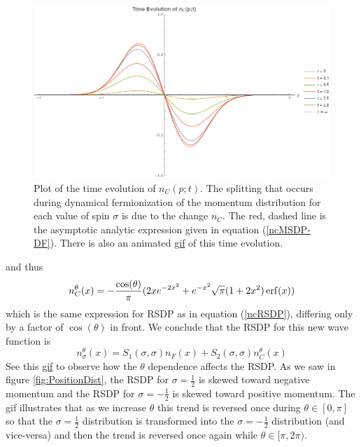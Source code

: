 \documentclass[onecolumn,english,aps,pra]{revtex4}
\begin{document}
\begin{figure}[h] 
\includegraphics[scale=0.45]{"../Plots/TimeEvolutionNC"}
\caption{Plot of the time evolution of $n_{C}(p;t)$. The splitting that occurs during dynamical fermionization of the momentum distribution for each value of spin $\sigma$ is due to the change $n_C$. The red, dashed line is the asymptotic analytic expression given in equation (\ref{ncMSDP-DF}). There is also an animated \href{https://github.com/TimSkaras/UltraColdAtoms/blob/master/Plots/TimeEvolutionNC.gif}{gif} of this time evolution.}
\label{fig:ncRSDP-DF}
\end{figure}
and thus 
\begin{equation}
n_C^\theta(x) = -\frac{\cos (\theta)}{\pi} (2xe^{-2x^2} + e^{-x^2}\sqrt{\pi} (1 + 2 x^2) \erf(x))
\end{equation}
which is the same expression for RSDP as in equation (\ref{ncRSDP}), differing only by a factor of $\cos(\theta)$ in front. We conclude that the RSDP for this new wave function is 
\begin{equation}
n_{\sigma}^\theta(x) = S_1(\sigma, \sigma)n_F(x) +  S_2(\sigma,\sigma) n_C^\theta(x)
\end{equation}
See this \href{https://github.com/TimSkaras/UltraColdAtoms/blob/master/Plots/ThetaEvolutionRSDP.gif}{gif} to observe how the $\theta$ dependence affects the RSDP. As we saw in figure \ref{fig:PositionDist}, the RSDP for  $\sigma = \frac{1}{2}$ is skewed toward negative momentum and the RSDP for  $\sigma = -\frac{1}{2}$ is skewed toward positive momentum. The gif illustrates that as we increase $\theta$ this trend is reversed once during $\theta \in [0, \pi]$ so that the $\sigma = \frac{1}{2}$ distribution is transformed into the $\sigma = -\frac{1}{2}$ distribution (and vice-versa) and then the trend is reversed once again while $\theta \in [\pi, 2\pi)$.
\end{document}
